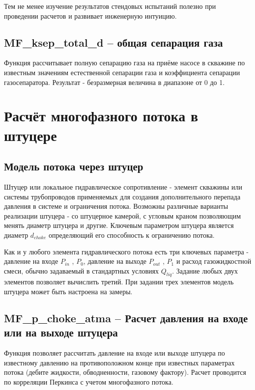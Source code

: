 Тем не менее изучение результатов стендовых испытаний полезно при проведении расчетов и развивает инженерную интуицию. 



\subsection{MF\_ksep\_total\_d – общая сепарация газа}

Функция рассчитывает полную сепарацию газа на приёме насосе в скважине по известным значениям естественной сепарации газа и коэффициента сепарации газосепаратора. Результат - безразмерная величина в диапазоне от 0 до 1. 


\section{Расчёт многофазного потока в штуцере}

\subsection{Модель потока через штуцер}


Штуцер или локальное гидравлическое сопротивление - элемент скважины или системы трубопроводов применяемых для создания дополнительного перепада давления в системе и ограничения потока. 
Возможны различные варианты реализации штуцера - со штуцерное камерой, с угловым краном позволяющим менять диаметр штуцера и другие.
Ключевым параметром штуцера является диаметр \(d_{choke} \) определяющий его способность к ограничению потока. 

Как и у любого элемента гидравлического потока есть три ключевых параметра - давление на входе \( P_{in} \) , \( P_0\), давление на выходе \(P_{out}\) , \( P_1\) и расход газожидкостной смеси, обычно задаваемый в стандартных условиях \(Q_{liq} \). Задание любых двух элементов позволяет вычислить третий. При задании трех элементов модель штуцера может быть настроена на замеры.
 

\subsection{MF\_p\_choke\_atma – Расчет давления на входе или на выходе штуцера}
Функция позволяет рассчитать давление на входе или выходе штуцера по известному давлению на противоположном конце при известных параметрах потока (дебите жидкости, обводненности, газовому фактору). Расчет проводится по корреляции Перкинса \cite{Perkins_1993} с учетом многофазного потока.  

